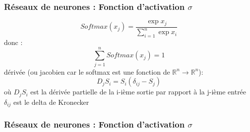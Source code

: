 \documentclass{formation}
\begin{document}
\begin{frame}
  \frametitle{Réseaux de neurones : Fonction d'activation $\sigma$}
  \[
  \mathit{Softmax}(x_j)=\frac{\exp{x_j}}{\sum_{i=1}^n{\exp{x_i}}}
  \]
  donc :
  \[
  \sum_{j=1}^n{\mathit{Softmax}(x_j)}=1
  \]
  dérivée (ou jacobien car le softmax est une fonction de $\mathbb{R}^n\rightarrow\mathbb{R}^n$):
  \[
  D_jS_i = S_i(\delta_{ij}-S_j)
  \]
  où
  $D_jS_i$ est la dérivée partielle de la i-ième sortie par rapport à la j-ième entrée
  \newline
  $\delta_{ij}$ est le delta de Kronecker
\end{frame}

\begin{frame}
  \frametitle{Réseaux de neurones : Fonction d'activation $\sigma$}
\end{frame}
\end{document}
